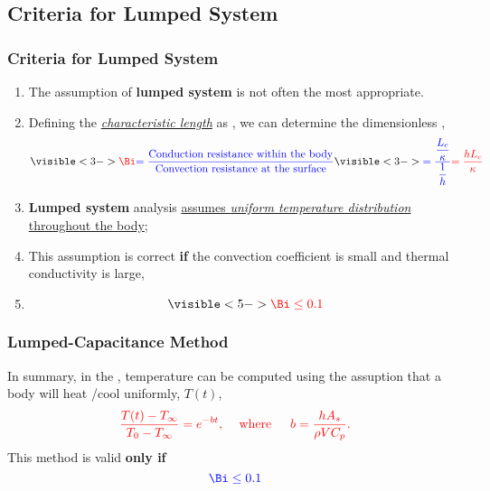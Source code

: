 \documentclass[10pt,compress,handout,ignorenonframetext,unknownkeysallowed]{beamer}
\begin{document}
\subsection{Criteria for Lumped System}


\begin{frame}
 \frametitle{Criteria for Lumped System}
   \begin{enumerate}%
     \item<1-> The assumption of {\bf lumped system} is not often the most appropriate. 
     \item<2-> Defining the \underline{\it characteristic length} as , we can determine the dimensionless ,
       \begin{equation}
          \visible<3->{\red{\Bi} \blue{= \frc{\text{Conduction resistance within the body}}{\text{Convection resistance at the surface}}}} \visible<3->{\blue{= \frc{\frc{L_{c}}{\kappa}}{\frc{1}{h}}} \red{= \frc{h L_{c}}{\kappa}}}
       \end{equation}  
     \item<4-> {\bf Lumped system} analysis \underline{assumes {\it uniform temperature distribution}} \underline{throughout the body};
     \item<4-> This assumption is correct {\bf if} the convection coefficient is small and thermal conductivity is large, \ie
     \item<5->  
                     \begin{displaymath}
                       \visible<5->{ \red{\Bi \leq 0.1}}
                     \end{displaymath}
   \end{enumerate}
\end{frame}

\begin{frame}
 \frametitle{Lumped-Capacitance Method}
    \begin{shaded}
       In summary, in the , temperature can be computed using the assuption that a body will heat /cool uniformly, \ie $T(t)$,
          \begin{displaymath}
             \textcolor{red}{\displaystyle\frac{T(t)-T_{\infty}}{T_{0}-T_{\infty}} = e^{-bt},\;\;\;\text{ where }\;\;\;\ b = \displaystyle\frac{hA_{s}}{\rho V C_{p}}.}
          \end{displaymath}
This method is valid {\bf only if}
           \begin{displaymath}
               \blue{\Bi \le 0.1}
           \end{displaymath}
    \end{shaded}

\end{frame} 
\end{document}
